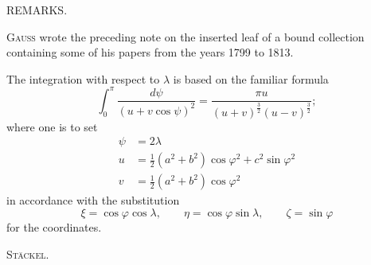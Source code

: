 %
\begin{center}REMARKS.\end{center}

\textsc{Gauss} wrote the preceding note on the inserted leaf of a bound collection containing some of his papers from the years 1799 to 1813.

The integration with respect to $\lambda$ is based on the familiar formula
\[
\int_0^\pi\frac{d\psi}{(u+v\cos\psi)^2}=\frac{\pi u}{(u+v)^{\frac32}(u-v)^{\frac32}};
\]
where one is to set
\[
\begin{aligned}
\psi&=2\lambda\\
u&=\tfrac12(a^2+b^2)\cos\varphi^2+c^2\sin\varphi^2\\
v&=\tfrac12(a^2+b^2)\cos\varphi^2
\end{aligned}
\]
in accordance with the substitution
\[
\xi=\cos\varphi\cos\lambda,\qquad\eta=\cos\varphi\sin\lambda,\qquad\zeta=\sin\varphi
\]
for the coordinates.\par\nobreak\hfill\textsc{Stäckel.}\par
